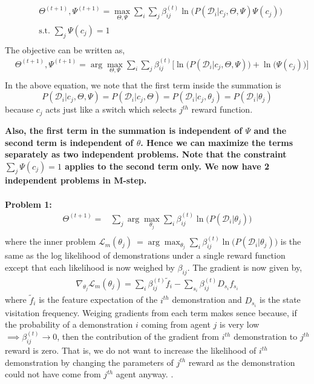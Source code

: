 \documentclass{article}[11pt]
\begin{document}
\begin{align*}
&\Theta^{(t+1)},\Psi^{(t+1)} = \max_{\Theta,\Psi} \sum_i \sum_j \beta_{ij}^{(t)} \ln\big(P(\mathcal{D}_i| c_j,\Theta,\Psi)\Psi(c_{j})\big) \\
&\text{s.t. } \sum_j \Psi(c_{j}) = 1\\
\end{align*}
The objective can be written as, 
\begin{align*}
&\Theta^{(t+1)},\Psi^{(t+1)} = \arg \max_{\Theta,\Psi} \sum_i \sum_j \beta_{ij}^{(t)} \Big[\ln\big(P(\mathcal{D}_i| c_j,\Theta,\Psi)\big) + \ln\big(\Psi(c_{j})\big)\Big]\\
\end{align*}
In the above equation, we note that the first term inside the summation is  $$P(\mathcal{D}_i| c_j,\Theta,\Psi) = P(\mathcal{D}_i| c_j,\Theta) = P(\mathcal{D}_i| c_j,\theta_j) = P(\mathcal{D}_i| \theta_j) $$ because $c_j$ acts just like a switch which selects $j^{th}$ reward function. 

\textbf{Also, the first term in the summation is independent of $\Psi$ and the second term is independent of $\theta$. Hence we can maximize the terms separately as two independent problems. Note that the constraint $\sum_j \Psi(c_j) = 1$ applies to the second term only.  We now have 2 independent problems in M-step.\\ \\}
\textbf{Problem 1: }
\begin{align}
\label{opt_problem}
 \Theta^{(t+1)} = &\sum_j  \arg \max_{\theta_j}\sum_i \beta_{ij}^{(t)} \ln\big(P(\mathcal{D}_i| \theta_j)\big)\\
\end{align} where the inner problem $\mathcal{L}_m(\theta_j)\ = \arg \max_{\theta_j}\sum_i \beta_{ij}^{(t)} \ln\big(P(\mathcal{D}_i| \theta_j)\big)$ is the same as the log likelihood of demonstrations under a single reward function \cite{ziebart2008maximum} except that each likelihood is now weighed by $\beta_{ij}$. The gradient is now given by, 
\begin{align*}
\nabla_{\theta_j}\mathcal{L}_m(\theta_j) = \sum_i \beta_{ij}^{(t)}\tilde{f}_i - \sum_{s_i}\beta_{ij}^{(t)}D_{s_i}f_{s_i}
\end{align*} where $\tilde{f}_i$ is the feature expectation of the $i^{th}$ demonstration and $D_{s_i}$ is the state visitation frequency. Weiging gradients from each term makes sence because, if the probability of a demonstration $i$ coming from agent $j$ is very low $\implies \beta_{ij}^{(t)} \to 0$, then the contribution of the gradient from $i^{th}$ demonstration to $j^{th}$ reward is zero. That is, we do not want to increase the likelihood of $i^{th}$ demonstration by changing the parameters of $j^{th}$ reward as the demonstration could not have come from $j^{th}$ agent anyway. \cite{ziebart2008maximum}. 
\end{document}
